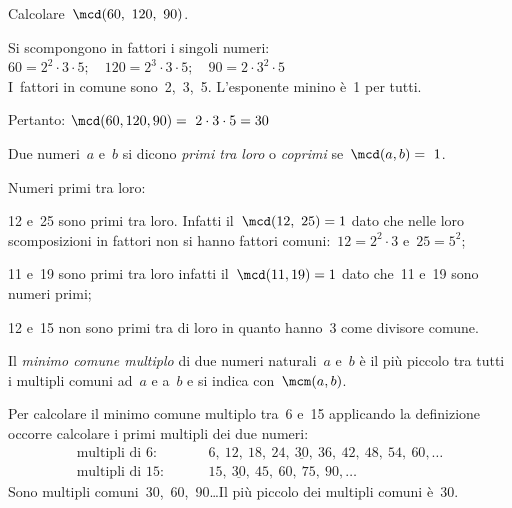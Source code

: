  \begin{esempio}
 Calcolare~\(\mcd(60,~120,~90)\).

Si scompongono in fattori i singoli numeri:\\
\(60 = 2^2\cdot3\cdot5; 
\quad 120 = 2^3\cdot3\cdot5; 
\quad 90 = 2\cdot3^2\cdot5\)\\
I~fattori in comune sono~2,~3,~5. L'esponente minino è~1 per tutti.

Pertanto: \quad \(\mcd(60,120,90)=~2\cdot3\cdot5=30\)
 \end{esempio}

\begin{definizione}
 Due numeri~\(a\) e~\(b\) si dicono \emph{primi tra loro} o \emph{coprimi} 
 se~\(\mcd(a,b) =~1\).
\end{definizione}

 \begin{esempio}
 Numeri primi tra loro:
 \begin{itemize*}
 \item 12 e~25 sono primi tra loro. Infatti il~\(\mcd(12,~25)=1\) dato che 
  nelle loro scomposizioni in fattori non si hanno fattori 
  comuni:~\(12 =2^2\cdot3\) e~\(25=5^2\);
 \item 11 e~19 sono primi tra loro infatti il~\(\mcd(11,19)=1\) dato che~11 
  e~19 sono numeri primi;
 \item 12 e~15 non sono primi tra di loro in quanto hanno~3 come divisore 
  comune.
 \end{itemize*}
 \end{esempio}

\begin{definizione}
 Il \emph{minimo comune multiplo} di due numeri naturali~\(a\) e~\(b\) è il più
 piccolo tra tutti i multipli comuni ad~\(a\) e a~\(b\) 
 e si indica con~\(\mcm(a,b)\).
\end{definizione}

Per calcolare il minimo comune multiplo tra~6 e~15 applicando la 
definizione 
occorre calcolare i primi multipli dei due numeri:
\begin{align*}
\text{multipli di }6: & 
\qquad~6,~12,~18,~24,~\underline{30},~36,~42,~48,~54,~60,\ldots \\
\text{multipli di }15: & \qquad~15,~\underline{30},~45,~60,~75,~90,\ldots
\end{align*}
Sono multipli comuni~30,~60,~90\ldots Il più piccolo dei multipli comuni 
è~30.

